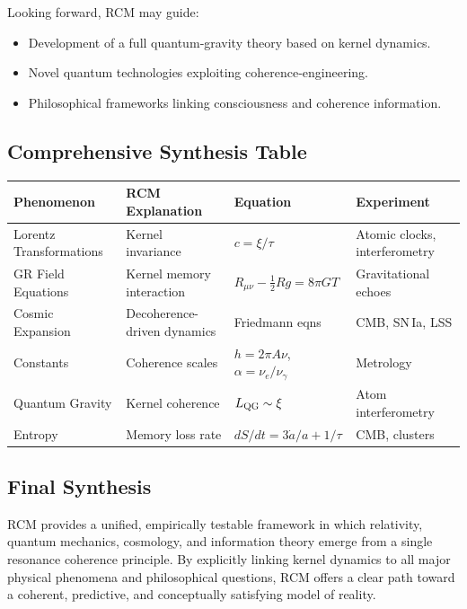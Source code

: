 Looking forward, RCM may guide:
\begin{itemize}
  \item Development of a full quantum‐gravity theory based on kernel dynamics.  
  \item Novel quantum technologies exploiting coherence‐engineering.  
  \item Philosophical frameworks linking consciousness and coherence information.
\end{itemize}

\subsection{Comprehensive Synthesis Table}

\begin{center}
\begin{tabular}{|l|l|l|l|}
\hline
Phenomenon               & RCM Explanation               & Equation                        & Experiment                     \\ \hline
Lorentz Transformations  & Kernel invariance             & $c=\xi/\tau$                   & Atomic clocks, interferometry  \\ \hline
GR Field Equations       & Kernel memory interaction     & $R_{\mu\nu}-\tfrac12R g=8\pi G T$ & Gravitational echoes            \\ \hline
Cosmic Expansion         & Decoherence-driven dynamics   & Friedmann eqns                  & CMB, SN\,Ia, LSS               \\ \hline
Constants                & Coherence scales              & $h=2\pi A\nu$, $\alpha=\nu_e/\nu_\gamma$ & Metrology            \\ \hline
Quantum Gravity          & Kernel coherence              & $L_{\rm QG}\sim\xi$             & Atom interferometry            \\ \hline
Entropy                  & Memory loss rate              & $dS/dt=3\dot a/a+1/\tau$         & CMB, clusters                  \\ \hline
\end{tabular}
\end{center}

\subsection{Final Synthesis}

RCM provides a unified, empirically testable framework in which relativity, quantum mechanics, cosmology, and information theory emerge from a single resonance coherence principle. By explicitly linking kernel dynamics to all major physical phenomena and philosophical questions, RCM offers a clear path toward a coherent, predictive, and conceptually satisfying model of reality.


